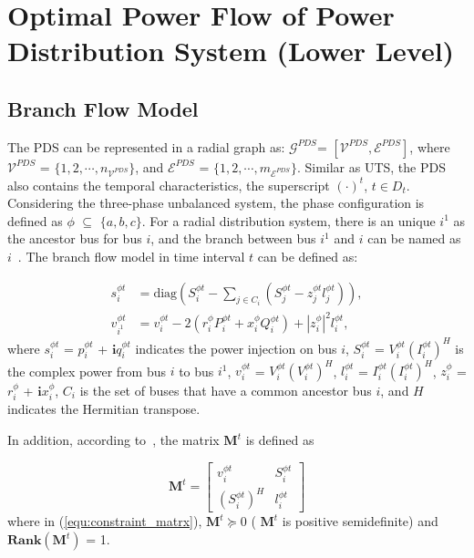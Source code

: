\documentclass[final]{IEEEtran}
\begin{document}
\section{Optimal Power Flow of Power Distribution System (Lower Level)}\label{sec:PDS}
\subsection{Branch Flow Model}\label{sec:BFM}

The PDS can be represented in a radial graph as: $\mathcal{G}^{PDS} $= $[\mathcal{V}^{PDS}, \mathcal{E}^{PDS}]$, where $\mathcal{V}^{PDS}$ = $\{1,2,\cdots, n_{\mathcal{V}^{PDS}}\}$, and $\mathcal{E}^{PDS}$ = $\{1,2,\cdots, m_{\mathcal{E}^{PDS}}\}$. Similar as UTS, the PDS also contains the temporal characteristics, the superscript $(\cdot)^t$, $t\in D_t$. Considering the three-phase unbalanced system, the phase configuration is defined as $\phi $ $\subseteq$ $\{a,b,c\}$. For a radial distribution system, there is an unique $i^1$ as the ancestor bus for bus $i$, and the branch between bus $i^1$ and $i$ can be named as $i$~\cite{pe015dis456ed,low201454convex}. The branch flow model in time interval $t$ can be defined as:

\begin{subequations}\label{equ:constraint_PDS_BFM}
	\begin{align} 
	s^{\phi t}_i &= \text{diag}(S^{\phi t}_i - \sum_{j \in C_i}(S^{\phi t}_j-z^{\phi t}_jl^{\phi t}_j)),  \label{equ:eps1} \\
	v^{\phi t}_{i^1} &= v^{\phi t}_i-2(r^{\phi }_{i}P^{\phi t}_{i} + x^{\phi }_{i}Q^{\phi t}_{i}) + |z^{\phi }_{i}|^2l^{\phi t}_{i}, \label{equ:eps2}
	\end{align}
\end{subequations}
where $s^{\phi t}_i$ = $p^{\phi t}_{i}$ + $\textbf{i}q^{\phi t}_{i}$ indicates the power injection on bus $i$, $S^{\phi t}_i$ = $V^{\phi t}_i (I^{\phi t}_i)^H$ is the complex power from bus $i$ to bus $i^1$, $v^{\phi t}_{i}$ = $V^{\phi t}_{i} (V^{\phi t}_{i})^H$, $l^{\phi t}_{i}$ = $I^{\phi t}_{i} (I^{\phi t}_{i})^H$, $z^{\phi }_{i}$ =  $r^{\phi }_{i}$ + $\textbf{i} x^{\phi }_{i}$, $C_i$ is the set of buses that have a common ancestor bus $i$, and $H$ indicates the Hermitian transpose.

In addition, according to~\cite{gan2014con123vex}, the matrix $\mathbf{M}^t$ is defined as

\begin{equation}
\mathbf{M}^t = 
\begin{bmatrix}
v^{\phi t}_{i} & S^{\phi t}_i \\[0.3em] \label{equ:constraint_matrx}
(S^{\phi t}_i)^H & l^{\phi t}_{i}         
\end{bmatrix}
\end{equation}
where in (\ref{equ:constraint_matrx}), $\mathbf{M}^t\succeq0$ ( $\mathbf{M}^t$ is positive semidefinite) and $\mathbf{Rank}({\mathbf{M}^t})$ = 1.
\end{document}
